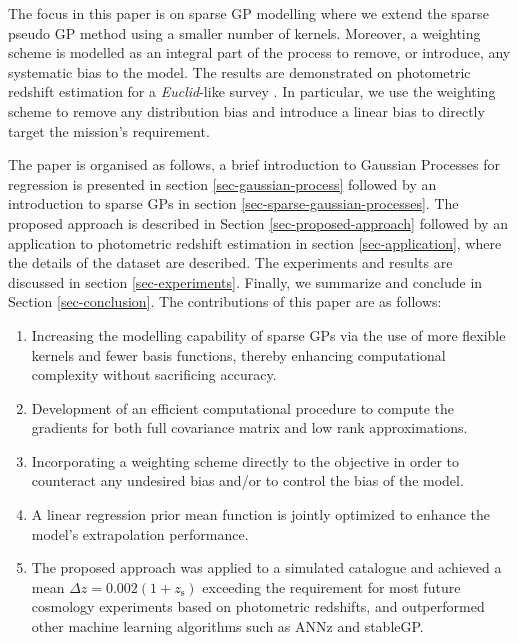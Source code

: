 \documentclass[useAMS,usenatbib,fleqn]{mn2e}
\begin{document}
The focus in this paper is on sparse GP modelling where we extend the sparse pseudo GP method using a smaller number of kernels. Moreover, a weighting scheme is modelled as an integral part of the process to remove, or introduce, any systematic bias to the model. The results are demonstrated on photometric redshift estimation for a {\em Euclid}-like survey \citep{laureijs2011}. In particular, we use the weighting scheme to remove any distribution bias and introduce a linear bias to directly target the mission's requirement. 

The paper is organised as follows, a brief introduction to Gaussian Processes for regression is presented in section \ref{sec-gaussian-process} followed by an introduction to sparse GPs in section \ref{sec-sparse-gaussian-processes}. The proposed approach is described in Section \ref{sec-proposed-approach} followed by an application to photometric redshift estimation in section \ref{sec-application}, where the details of the dataset are described. The experiments and results are discussed in section \ref{sec-experiments}. Finally, we summarize and conclude in Section \ref{sec-conclusion}. The contributions of this paper are as follows:
\begin{enumerate}
  \item Increasing the modelling capability of sparse GPs via the use of more flexible kernels and fewer basis functions, thereby enhancing computational complexity without sacrificing accuracy.
  \item Development of an efficient computational procedure to compute the gradients for both full covariance matrix and low rank approximations.
  \item Incorporating a weighting scheme directly to the objective in order to counteract any undesired bias and/or to control the bias of the model. 
  \item A linear regression prior mean function is jointly optimized to enhance the model's extrapolation performance.
  \item The proposed approach was applied to a simulated catalogue and achieved  a mean $\Delta z = 0.002(1+z_\textrm{s})$ exceeding the requirement for most future cosmology experiments based on photometric redshifts, and outperformed other machine learning algorithms such as ANNz and stableGP.
\end{enumerate}
\end{document}

